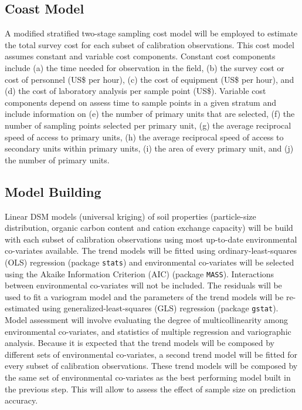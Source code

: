 \subsection{Coast Model}

A modified stratified two-stage sampling cost model will be employed to estimate the total survey cost for each subset of calibration observations. This cost model assumes constant and variable cost components. Constant cost components include (a) the time needed for observation in the field, (b) the survey cost or cost of personnel (US\$ per hour), (c) the cost of equipment (US\$ per hour), and (d) the cost of laboratory analysis per sample point (US\$). Variable cost components depend on assess time to sample points in a given stratum and include information on (e) the number of primary units that are selected, (f) the number of sampling points selected per primary unit, (g) the average reciprocal speed of access to primary units, (h) the average reciprocal speed of access to secondary units within primary units, (i) the area of every primary unit, and (j) the number of primary units.

\subsection{Model Building}

Linear DSM models (universal kriging) of soil properties (particle-size distribution, organic carbon content and cation exchange capacity) will be build with each subset of calibration observations using most up-to-date environmental co-variates available. The trend models will be fitted using ordinary-least-squares (OLS) regression (package \texttt{stats}) and environmental co-variates will be selected using the Akaike Information Criterion (AIC) (package \texttt{MASS}). Interactions between environmental co-variates will not be included. The residuals will be used to fit a variogram model and the parameters of the trend models will be re-estimated using generalized-least-squares (GLS) regression (package \texttt{gstat}). Model assessment will involve evaluating the degree of multicollinearity among environmental co-variates, and statistics of multiple regression and variographic analysis. Because it is expected that the trend models will be composed by different sets of environmental co-variates, a second 
trend model will be fitted for every subset of calibration observations. These trend models will be composed by the same set of environmental co-variates as the best performing model built in the previous step. This will allow to assess the effect of sample size on prediction accuracy.

